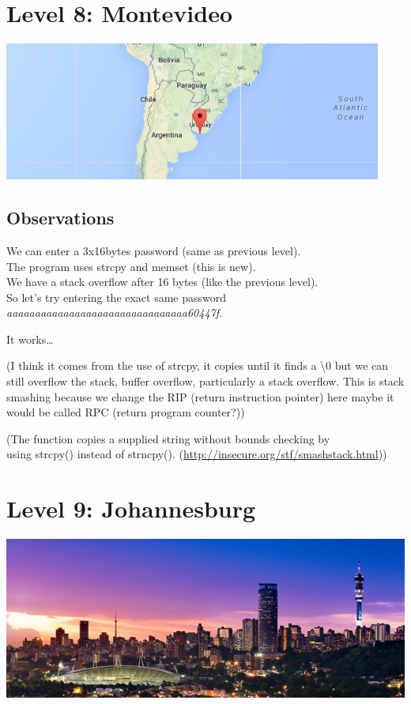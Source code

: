 \documentclass[a4paper,11pt]{article}
\begin{document}
\section{Level 8: Montevideo}\label{level-8-montevideo}

\includegraphics{img/8_1.PNG}

\subsection{Observations}\label{observations-4}

We can enter a 3x16bytes password (same as previous level).\\The program
uses strcpy and memset (this is new).\\We have a stack overflow after 16
bytes (like the previous level).\\So let's try entering the exact same
password \emph{aaaaaaaaaaaaaaaaaaaaaaaaaaaaaaaa60447f}.

It works\ldots{}

(I think it comes from the use of strcpy, it copies until it finds a
\textbackslash{}0 but we can still overflow the stack, buffer overflow,
particularly a stack overflow. This is stack smashing because we change
the RIP (return instruction pointer) here maybe it would be called RPC
(return program counter?))

(The function copies a supplied string without bounds checking by\\using
strcpy() instead of strncpy().
(\url{http://insecure.org/stf/smashstack.html}))

\section{Level 9: Johannesburg}\label{level-9-johannesburg}

\includegraphics{img/9_2.PNG}
\end{document}
